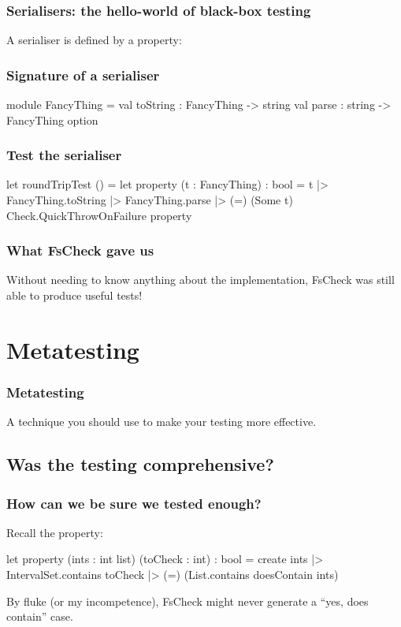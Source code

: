 \documentclass{beamer}
\begin{document}
\begin{frame}
\frametitle{Serialisers: the hello-world of black-box testing}

A serialiser is defined by a property:

\hfill \break

\noindent{}

\end{frame}

\begin{frame}[fragile]
\frametitle{Signature of a serialiser}

\begin{fslisting}
[<RequireQualifiedAccess>]
module FancyThing =
    val toString : FancyThing -> string
    val parse : string -> FancyThing option
\end{fslisting}
\end{frame}

\begin{frame}[fragile]
\frametitle{Test the serialiser}

\begin{fslisting}
[<Test>]
let roundTripTest () =
    let property (t : FancyThing) : bool =
        t
        |> FancyThing.toString
        |> FancyThing.parse
        |> (=) (Some t)
    Check.QuickThrowOnFailure property
\end{fslisting}
\end{frame}

\begin{frame}
\frametitle{What FsCheck gave us}
Without needing to know anything about the implementation, FsCheck was still able to produce useful tests!
\end{frame}

\section{Metatesting}
\tableofcontents[currentsection]

\begin{frame}
\frametitle{Metatesting}
A technique you should use to make your testing more effective.
\end{frame}

\subsection{Was the testing comprehensive?}

\begin{frame}[fragile]
\frametitle{How can we be sure we tested enough?}

Recall the property:
\begin{fslisting}
let property (ints : int list) (toCheck : int) : bool =
    create ints
    |> IntervalSet.contains toCheck
    |> (=) (List.contains doesContain ints)

\end{fslisting}

\pause
By fluke (or my incompetence), FsCheck might never generate a ``yes, does contain'' case.
\end{frame}
\end{document}
